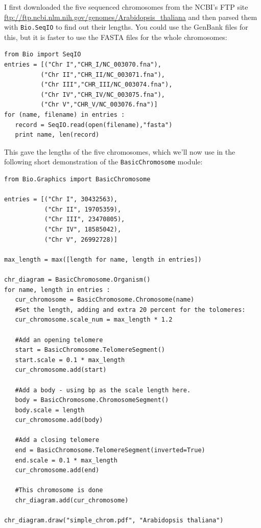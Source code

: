 \documentclass{report}
\begin{document}
I first downloaded the five sequenced chromosomes from the NCBI's FTP site
\url{ftp://ftp.ncbi.nlm.nih.gov/genomes/Arabidopsis_thaliana} and then parsed
them with \verb|Bio.SeqIO| to find out their lengths.  You could use the
GenBank files for this, but it is faster to use the FASTA files for the
whole chromosomes:

\begin{verbatim}
from Bio import SeqIO
entries = [("Chr I","CHR_I/NC_003070.fna"),
          ("Chr II","CHR_II/NC_003071.fna"),
          ("Chr III","CHR_III/NC_003074.fna"),
          ("Chr IV","CHR_IV/NC_003075.fna"),
          ("Chr V","CHR_V/NC_003076.fna")]
for (name, filename) in entries :
   record = SeqIO.read(open(filename),"fasta")
   print name, len(record)
\end{verbatim}

\noindent This gave the lengths of the five chromosomes, which we'll now use in
the following short demonstration of the \verb|BasicChromosome| module:

\begin{verbatim}
from Bio.Graphics import BasicChromosome

entries = [("Chr I", 30432563),
           ("Chr II", 19705359),
           ("Chr III", 23470805),
           ("Chr IV", 18585042),
           ("Chr V", 26992728)]

max_length = max([length for name, length in entries])
          
chr_diagram = BasicChromosome.Organism()
for name, length in entries :
   cur_chromosome = BasicChromosome.Chromosome(name)
   #Set the length, adding and extra 20 percent for the tolomeres:
   cur_chromosome.scale_num = max_length * 1.2
   
   #Add an opening telomere
   start = BasicChromosome.TelomereSegment()
   start.scale = 0.1 * max_length
   cur_chromosome.add(start)

   #Add a body - using bp as the scale length here.
   body = BasicChromosome.ChromosomeSegment()
   body.scale = length
   cur_chromosome.add(body)

   #Add a closing telomere
   end = BasicChromosome.TelomereSegment(inverted=True)
   end.scale = 0.1 * max_length
   cur_chromosome.add(end)

   #This chromosome is done
   chr_diagram.add(cur_chromosome)

chr_diagram.draw("simple_chrom.pdf", "Arabidopsis thaliana")
\end{verbatim}
\end{document}
